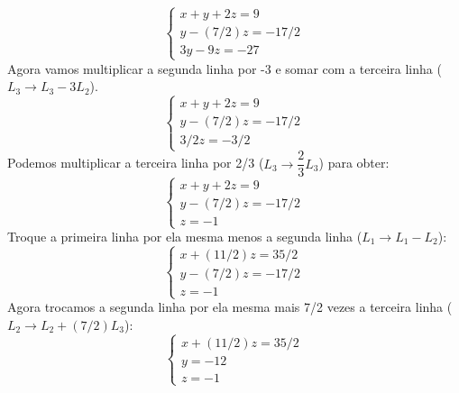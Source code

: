 \begin{exemplos}
\begin{solucao}
\begin{enumerate}[label={\arabic*})]
                        \[
                            \begin{cases}
                                x + y + 2z = 9\\
                                y - (7/2)z = -17/2\\
                                3y - 9z = -27
                            \end{cases}
                        \]
                        Agora vamos multiplicar a segunda linha por -3 e somar com a terceira linha ($L_3 \to L_3 - 3L_2$).
                        \[
                            \begin{cases}
                                x + y + 2z = 9\\
                                y - (7/2)z = -17/2\\
                                3/2z = -3/2
                            \end{cases}
                        \]
                        Podemos multiplicar a terceira linha por 2/3 ($L_3 \to \dfrac{2}{3}L_3$) para obter:
                        \[
                            \begin{cases}
                                x + y + 2z = 9\\
                                y - (7/2)z = -17/2\\
                                z = -1
                            \end{cases}
                        \]
                        Troque a primeira linha por ela mesma menos a segunda linha ($L_1 \to L_1 - L_2$):
                        \[
                            \begin{cases}
                                x + (11/2)z = 35/2\\
                                y - (7/2)z = -17/2\\
                                z = -1
                            \end{cases}
                        \]
                        Agora trocamos a segunda linha por ela mesma mais 7/2 vezes a terceira linha ($L_2 \to L_2 + (7/2)L_3$):
                        \[
                            \begin{cases}
                                x + (11/2)z = 35/2\\
                                y  = -12\\
                                z = -1
                            \end{cases}
\]
\end{enumerate}
\end{solucao}
\end{exemplos}
